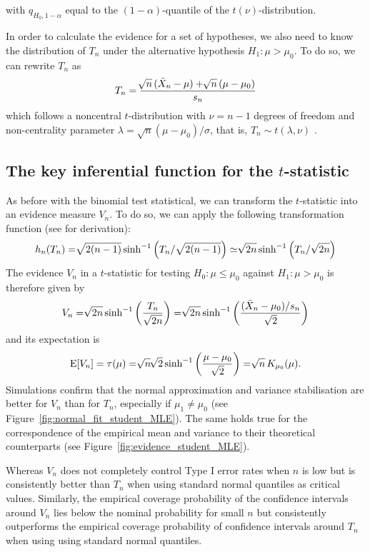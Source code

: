 with $q_{H_0,1-\alpha}$ equal to the $(1-\alpha)$-quantile of the $t(\nu)$-distribution.\par 
In order to calculate the evidence for a set of hypotheses, we also need to know the distribution of $T_n$ under the alternative hypothesis $H_1: \mu > \mu_0$. To do so, we can rewrite $T_n$ as 
$$T_n = \frac{\sqrt[]{n}\,(\Bar{X}_n-\mu) + \sqrt[]{n}\,(\mu-\mu_0)}{s_n}$$
which follows a noncentral $t$-distribution with $\nu = n-1$ degrees of freedom and non-centrality parameter $\lambda = \sqrt{n}(\mu-\mu_0)/\sigma$, that is, ${T_n \sim t(\lambda,\nu)}$ \citep[p.~159--160]{kulinskaya_meta_2008}.\par %
\subsection{The key inferential function for the \texorpdfstring{$t$}{t}-statistic}
\label{subsec:kif_t-statistic}
As before with the binomial test statistical, we can transform the $t$-statistic into an evidence measure $V_n$. To do so, we can apply the following transformation function (see \citet[p.~160--161]{kulinskaya_meta_2008} for derivation):
$$h_n(T_n) = \sqrt[]{2(n-1)}\, \text{sinh}^{-1}\left( T_n/\sqrt{2(n-1)}\right) \simeq \sqrt[]{2n}\, \text{sinh}^{-1}\left( T_n/\sqrt{2n}\right)$$ %
The evidence $V_n$ in a $t$-statistic for testing ${H_0: \mu \leq \mu_0}$ against ${H_1: \mu > \mu_0}$ is therefore given by
\begin{align}
    V_n = \sqrt[]{2n}\,\text{sinh}^{-1}\left(\frac{T_n}{\sqrt{2n}}\right)=\sqrt[]{2n}\,\text{sinh}^{-1}\left(\frac{(\bar{X}_n-\mu_0)/s_n}{\sqrt{2}}\right) \label{eq:Vn_stud}
\end{align}
and its expectation is
$${\operatorname{\text{E}}[V_n] = \tau(\mu) = \sqrt[]{n}\, \sqrt[]{2}\, \text{sinh}^{-1}\left(\frac{\mu-\mu_0}{\sqrt{2}}\right) =  \sqrt[]{n}\, K_{\mu_0}(\mu)}.$$
Simulations confirm that the normal approximation and variance stabilisation are better for $V_n$ than for $T_n$, especially if $\mu_1 \neq \mu_0$ (see Figure~\ref{fig:normal_fit_student_MLE}). The same holds true for the correspondence of the empirical mean and variance to their theoretical counterparts (see Figure~\ref{fig:evidence_student_MLE}).\par 
Whereas $V_n$ does not completely control Type I error rates when $n$ is low but is consistently better than $T_n$ when using standard normal quantiles as critical values. Similarly, the empirical coverage probability of the confidence intervals around $V_n$ lies below the nominal probability for small $n$ but consistently outperforms the empirical coverage probability of confidence intervals around $T_n$ when using using standard normal quantiles.\par

